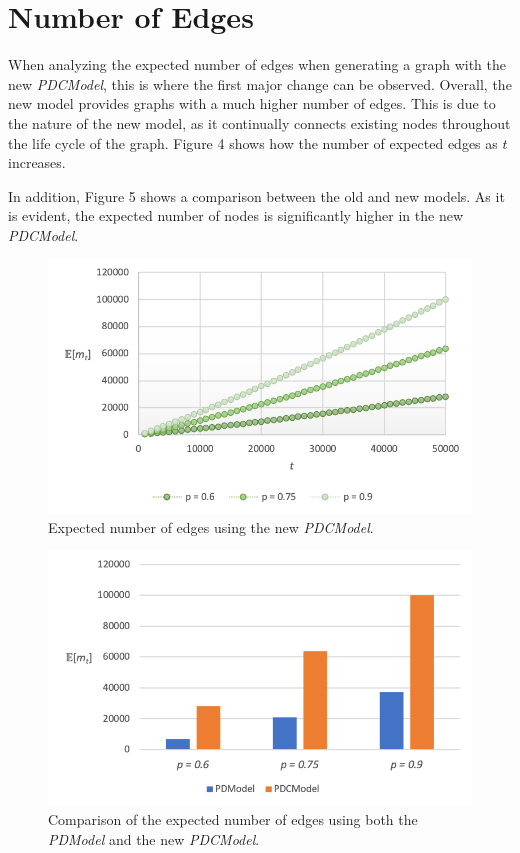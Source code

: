 \documentclass[final,3p,times,twocolumn]{elsarticle}
\begin{document}
\section{Number of Edges}
\label{S:6}

When analyzing the expected number of edges when generating a graph with the new \textit{PDCModel}, this is where the first major change can be observed. Overall, the new model provides graphs with a much higher number of edges. This is due to the nature of the new model, as it continually connects existing nodes throughout the life cycle of the graph. Figure 4 shows how the number of expected edges as $t$ increases.

In addition, Figure 5 shows a comparison between the old and new models. As it is evident, the expected number of nodes is significantly higher in the new \textit{PDCModel}.

\begin{figure}[h]
\centering
\includegraphics[width=1\linewidth]{edges.png}
\caption{Expected number of edges using the new \textit{PDCModel}.}
\end{figure}

\begin{figure}[h]
\centering
\includegraphics[width=1\linewidth]{edges-comparison.png}
\caption{Comparison of the expected number of edges using both the \textit{PDModel} and the new \textit{PDCModel}.}
\end{figure}
\end{document}
